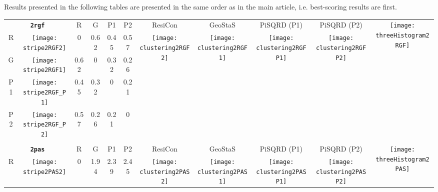 \documentclass[a4paper,11pt,twoside]{book}%
\begin{document}
\begin{appendices}
\newlength{\bufferspace}
\setlength{\bufferspace}{3cm}


Results presented in the following tables are presented in the same order as in the main article, i.e. best-scoring results are first.
\begin{sidewaystable}[h!]
\sffamily
\begin{tabular*}{4cm}{cc|c|c|c|c|c|c|c|c|c|}
\cline{1-11}
\multicolumn{2}{|c|}{{\bf \texttt{2rgf}}} & R & G & P1 & P2 & ResiCon & GeoStaS & PiSQRD (P1) & PiSQRD (P2) & \multirow{5}{*}{\vspace{-0.15cm}\texttt{[image: threeHistogram2RGF]}}  \\
\cline{1-10}
\multicolumn{1}{|c|}{R} & \texttt{[image: stripe2RGF2]} & 0 & 0.62 & 0.45 & 0.57 & \multirow{4}{*}{\vspace{-0.3cm}\texttt{[image: clustering2RGF2]}} & \multirow{4}{*}{\vspace{-0.3cm}\texttt{[image: clustering2RGF1]}} & \multirow{4}{*}{\vspace{-0.3cm}\texttt{[image: clustering2RGFP1]}} & \multirow{4}{*}{\vspace{-0.3cm}\texttt{[image: clustering2RGFP2]}} &  \multirow{5}{*}{} \\
\cline{1-6}
\multicolumn{1}{|c|}{G} & \texttt{[image: stripe2RGF1]} & 0.62 & 0 & 0.32 & 0.26 & \multirow{4}{*}{} & \multirow{4}{*}{} & \multirow{4}{*}{} & \multirow{4}{*}{} & \multirow{5}{*}{} \\
\cline{1-6}
\multicolumn{1}{|c|}{P1} & \texttt{[image: stripe2RGF\_P1]} & 0.45 & 0.32 & 0 & 0.21 & \multirow{4}{*}{} & \multirow{4}{*}{} & \multirow{4}{*}{} & \multirow{4}{*}{} & \multirow{5}{*}{}  \\
\cline{1-6}
\multicolumn{1}{|c|}{P2} & \texttt{[image: stripe2RGF\_P2]} & 0.57 & 0.26 & 0.21 & 0 & \multirow{4}{*}{} & \multirow{4}{*}{} & \multirow{4}{*}{} & \multirow{4}{*}{} & \multirow{5}{*}{}  \\
\cline{1-11}
\\
\cline{1-11}
\multicolumn{2}{|c|}{{\bf \texttt{2pas}}} & R & G & P1 & P2 & ResiCon & GeoStaS & PiSQRD (P1) & PiSQRD (P2) & \multirow{5}{*}{\vspace{-0.15cm}\texttt{[image: threeHistogram2PAS]}}  \\
\cline{1-10}
\multicolumn{1}{|c|}{R} & \texttt{[image: stripe2PAS2]} & 0 & 1.94 & 2.39 & 2.45 & \multirow{4}{*}{\vspace{-0.3cm}\texttt{[image: clustering2PAS2]}} & \multirow{4}{*}{\vspace{-0.3cm}\texttt{[image: clustering2PAS1]}} & \multirow{4}{*}{\vspace{-0.3cm}\texttt{[image: clustering2PASP1]}} & \multirow{4}{*}{\vspace{-0.3cm}\texttt{[image: clustering2PASP2]}} &  \multirow{5}{*}{} \\

\end{tabular*}
\end{sidewaystable}
\end{appendices}
\end{document}
